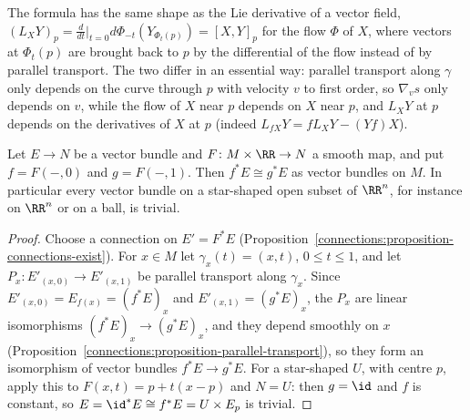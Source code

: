 The formula has the same shape as the Lie derivative of a vector field, $(L_XY)_p = \frac{d}{dt}\big|_{t=0}d\Phi_{-t}(Y_{\Phi_t(p)}) = [X, Y]_p$ for the flow $\Phi$ of $X$, where vectors at $\Phi_t(p)$ are
brought back to $p$ by the differential of the flow instead of by parallel transport. The two differ in an essential way: parallel transport along $\gamma$ only depends on the curve through $p$ with velocity $v$ to first order, so $\nabla_vs$ only depends on $v$,
while the flow of $X$ near $p$ depends on $X$ near $p$, and $L_XY$ at $p$ depends on the derivatives of $X$ at $p$ (indeed $L_{fX}Y = fL_XY - (Yf)X$).

\begin{proposition}\label{connections:proposition-homotopy-invariance}
Let $E \to N$ be a vector bundle and $F \colon M \times \RR \to N$ a smooth map, and put $f = F(-, 0)$ and $g = F(-, 1)$. Then $f^*E \cong g^*E$ as vector bundles on $M$. In particular every vector bundle on a star-shaped open
subset of $\RR^n$, for instance on $\RR^n$ or on a ball, is trivial.
\end{proposition}

\begin{proof}
Choose a connection on $E' = F^*E$ (Proposition~\ref{connections:proposition-connections-exist}). For $x \in M$ let $\gamma_x(t) = (x, t)$, $0 \leq t \leq 1$, and let $P_x \colon E'_{(x,0)} \to E'_{(x,1)}$ be parallel
transport along $\gamma_x$. Since $E'_{(x,0)} = E_{f(x)} = (f^*E)_x$ and $E'_{(x,1)} = (g^*E)_x$, the $P_x$ are linear isomorphisms $(f^*E)_x \to (g^*E)_x$, and they depend smoothly on $x$
(Proposition~\ref{connections:proposition-parallel-transport}), so they form an isomorphism of vector bundles $f^*E \to g^*E$. For a star-shaped $U$, with centre $p$, apply this to $F(x, t) = p + t(x - p)$ and
$N = U$: then $g = \id$ and $f$ is constant, so $E = \id^*E \cong f^*E = U \times E_p$ is trivial.
\end{proof}

